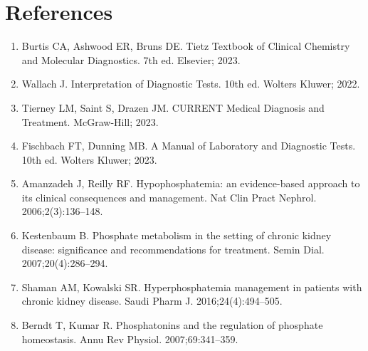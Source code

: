 \section*{References}
\begin{enumerate}
  \item Burtis CA, Ashwood ER, Bruns DE. Tietz Textbook of Clinical Chemistry and Molecular Diagnostics. 7th ed. Elsevier; 2023.
  \item Wallach J. Interpretation of Diagnostic Tests. 10th ed. Wolters Kluwer; 2022.
  \item Tierney LM, Saint S, Drazen JM. CURRENT Medical Diagnosis and Treatment. McGraw-Hill; 2023.
  \item Fischbach FT, Dunning MB. A Manual of Laboratory and Diagnostic Tests. 10th ed. Wolters Kluwer; 2023.
  \item Amanzadeh J, Reilly RF. Hypophosphatemia: an evidence-based approach to its clinical consequences and management. Nat Clin Pract Nephrol. 2006;2(3):136--148.
  \item Kestenbaum B. Phosphate metabolism in the setting of chronic kidney disease: significance and recommendations for treatment. Semin Dial. 2007;20(4):286--294.
  \item Shaman AM, Kowalski SR. Hyperphosphatemia management in patients with chronic kidney disease. Saudi Pharm J. 2016;24(4):494--505.
  \item Berndt T, Kumar R. Phosphatonins and the regulation of phosphate homeostasis. Annu Rev Physiol. 2007;69:341--359.
\end{enumerate}

\clearpage

